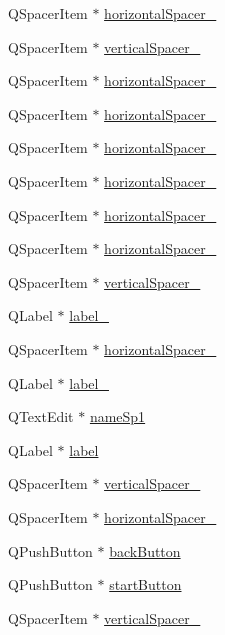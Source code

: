 \begin{DoxyCompactItemize}
Q\-Spacer\-Item $\ast$ \hyperlink{classUi__newGame_aef5be25ae91eaa69257ba5908014e653}{horizontal\-Spacer\-\_}
\item 
Q\-Spacer\-Item $\ast$ \hyperlink{classUi__newGame_a7754cc1e5beacbc19caeab96ca46956d}{vertical\-Spacer\-\_}
\item 
Q\-Spacer\-Item $\ast$ \hyperlink{classUi__newGame_a6184926d06f233642f9dc2f2c48dedde}{horizontal\-Spacer\-\_}
\item 
Q\-Spacer\-Item $\ast$ \hyperlink{classUi__newGame_a2506ba5bd3b4544eb26016ff328478e0}{horizontal\-Spacer\-\_}
\item 
Q\-Spacer\-Item $\ast$ \hyperlink{classUi__newGame_a7e7b0deb5f2455d997959d435687ef19}{horizontal\-Spacer\-\_}
\item 
Q\-Spacer\-Item $\ast$ \hyperlink{classUi__newGame_aa84abb9645df1ae12c1d42cf7a7dc4dc}{horizontal\-Spacer\-\_}
\item 
Q\-Spacer\-Item $\ast$ \hyperlink{classUi__newGame_a5a75ee21e54947c037ab8c6d8cce484b}{horizontal\-Spacer\-\_}
\item 
Q\-Spacer\-Item $\ast$ \hyperlink{classUi__newGame_a36d06500313857d8295236a04b7e2b0c}{horizontal\-Spacer\-\_}
\item 
Q\-Spacer\-Item $\ast$ \hyperlink{classUi__newGame_a5946e4c83533cb09dbff3dcc02667365}{vertical\-Spacer\-\_}
\item 
Q\-Label $\ast$ \hyperlink{classUi__newGame_a3e71303542049a7a9c24bef2de4e7391}{label\-\_}
\item 
Q\-Spacer\-Item $\ast$ \hyperlink{classUi__newGame_af9aa543501ef7bc57fef8aab55aff640}{horizontal\-Spacer\-\_}
\item 
Q\-Label $\ast$ \hyperlink{classUi__newGame_aa7c6a051d9909f9677e2a68894fcee3a}{label\-\_}
\item 
Q\-Text\-Edit $\ast$ \hyperlink{classUi__newGame_a2cb4bf1c46b59268584f1fa07d295616}{name\-Sp1}
\item 
Q\-Label $\ast$ \hyperlink{classUi__newGame_ac7a6048d7467ebebd741bd6f69055b0f}{label}
\item 
Q\-Spacer\-Item $\ast$ \hyperlink{classUi__newGame_a06a2895bbb196b985b0b2e2ab4f497e3}{vertical\-Spacer\-\_}
\item 
Q\-Spacer\-Item $\ast$ \hyperlink{classUi__newGame_a9afd60eaeea35e920ffe71b9f8a7a139}{horizontal\-Spacer\-\_}
\item 
Q\-Push\-Button $\ast$ \hyperlink{classUi__newGame_aa1b7c795fc8671d7312b83f73f84c371}{back\-Button}
\item 
Q\-Push\-Button $\ast$ \hyperlink{classUi__newGame_a201c8bf9017a17f209189ed292073aeb}{start\-Button}
\item 
Q\-Spacer\-Item $\ast$ \hyperlink{classUi__newGame_a1d57e197dfab5615dd19cf28da670024}{vertical\-Spacer\-\_}
\end{DoxyCompactItemize}


